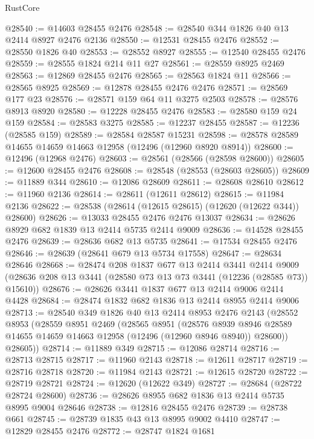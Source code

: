\begin{lexlean}{RustCore}
\begin{coremodule}
@28540 := @14603 @28455 @2476
@28548 := @28540 @344 @1826 @40 @13 @2414 @8927 @2476 @2136
@28550 := @12531 @28455 @2476
@28552 := @28550 @1826 @40
@28553 := @28552 @8927
@28555 := @12540 @28455 @2476
@28559 := @28555 @1824 @214 @11 @27
@28561 := @28559 @8925 @2469
@28563 := @12869 @28455 @2476
@28565 := @28563 @1824 @11
@28566 := @28565 @8925
@28569 := @12878 @28455 @2476 @2476
@28571 := @28569 @177 @23
@28576 := @28571 @159 @64 @11 @3275 @2503
@28578 := @28576 @8913 @8920
@28580 := @12228 @28455 @2476
@28583 := @28580 @159 @24 @159
@28584 := @28583 @3275
@28585 := @12237 @28455
@28587 := @12236 (@28585 @159)
@28589 := @28584 @28587 @15231
@28598 := @28578 @28589 @14655 @14659 @14663 @12958 (@12496 (@12960 @8920 @8914))
@28600 := @12496 (@12968 @2476)
@28603 := @28561 (@28566 (@28598 @28600))
@28605 := @12600 @28455 @2476
@28608 := @28548 (@28553 (@28603 @28605))
@28609 := @11889 @344
@28610 := @12086 @28609
@28611 := @28608 @28610
@28612 := @11960 @2136
@28614 := @28611 (@12611 @28612)
@28615 := @11984 @2136
@28622 := @28538 (@28614 (@12615 @28615) (@12620 (@12622 @344)) @28600)
@28626 := @13033 @28455 @2476 @2476 @13037
@28634 := @28626 @8929 @682 @1839 @13 @2414 @5735 @2414 @9009
@28636 := @14528 @28455 @2476
@28639 := @28636 @682 @13 @5735
@28641 := @17534 @28455 @2476
@28646 := @28639 (@28641 @679 @13 @5734 @17558)
@28647 := @28634 @28646
@28668 := @28474
    @208
    @1837
    @677
    @13
    @2414
    @3441
    @2414
    @9009
    (@28636 @208 @13 @3441 (@28580 @73 @13 @73 @3441 (@12236 (@28585 @73)) @15610))
@28676 := @28626 @3441 @1837 @677 @13 @2414 @9006 @2414 @4428
@28684 := @28474 @1832 @682 @1836 @13 @2414 @8955 @2414 @9006
@28713 := @28540
    @349
    @1826
    @40
    @13
    @2414
    @8953
    @2476
    @2143
    (@28552
      @8953
      (@28559
        @8951
        @2469
        (@28565
          @8951
          (@28576
            @8939
            @8946
            @28589
            @14655
            @14659
            @14663
            @12958
            (@12496 (@12960 @8946 @8940))
            @28600))
        @28605))
@28714 := @11889 @349
@28715 := @12086 @28714
@28716 := @28713 @28715
@28717 := @11960 @2143
@28718 := @12611 @28717
@28719 := @28716 @28718
@28720 := @11984 @2143
@28721 := @12615 @28720
@28722 := @28719 @28721
@28724 := @12620 (@12622 @349)
@28727 := @28684 (@28722 @28724 @28600)
@28736 := @28626 @8955 @682 @1836 @13 @2414 @5735 @8995 @9004 @28646
@28738 := @12816 @28455 @2476
@28739 := @28738 @661
@28745 := @28739 @1835 @43 @13 @8995 @9002 @4410
@28747 := @12829 @28455 @2476
@28772 := @28747
    @1824
    @1681

\end{coremodule}
\end{lexlean}

